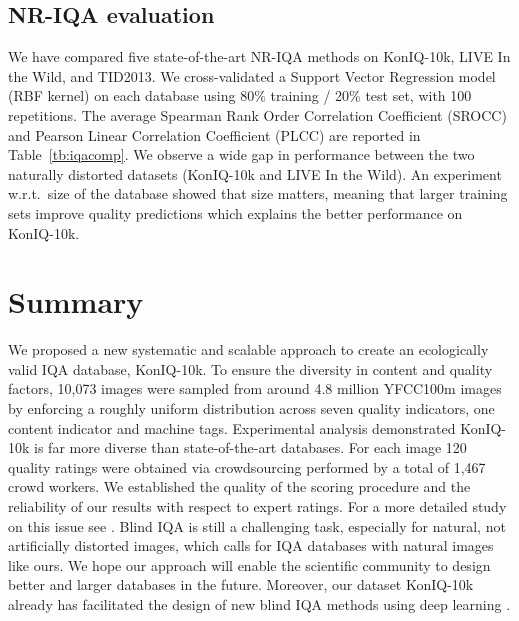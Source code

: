 \documentclass{article}
\begin{document}
\vspace{-5pt}
\subsection{NR-IQA evaluation}














We have compared five state-of-the-art NR-IQA  \cite{Moorthy:2010, Saad:2012, Mittal:2012, Moorthy:2011, Liu:2014b} methods on KonIQ-10k, LIVE In the Wild, and TID2013.
We cross-validated a Support Vector Regression model (RBF kernel) on each database using 80\% training / 20\% test set, with 100 repetitions. The average Spearman Rank Order Correlation Coefficient (SROCC) and Pearson Linear Correlation Coefficient (PLCC) are reported in Table~\ref{tb:iqacomp}. 
We observe a wide gap in performance between the two naturally distorted datasets (KonIQ-10k and LIVE In the Wild). An experiment w.r.t.\ size of the database showed that size matters, meaning that larger training sets improve quality predictions which explains the better performance on KonIQ-10k.
\vspace{-3pt}
\section{Summary}

We proposed a new systematic and scalable approach to create an ecologically valid IQA database, KonIQ-10k. To ensure the diversity in content and quality factors, 10,073 images were sampled from around 4.8 million YFCC100m images by enforcing a roughly uniform distribution across seven quality indicators, one content indicator and machine tags. Experimental analysis demonstrated KonIQ-10k is far more diverse than state-of-the-art databases. For each image 120 quality ratings were obtained via crowdsourcing performed by a total of 1,467 crowd workers. We established the quality of the scoring procedure and the reliability of our results with respect to expert ratings. For a more detailed study on this issue see \cite{QoMEXReliability}. Blind IQA is still a challenging task, especially for natural, not artificially distorted images, which calls for IQA databases with natural images like ours. We hope our approach will enable the scientific community to design better and larger databases in the future. Moreover, our dataset KonIQ-10k already has facilitated the design of new blind IQA methods using deep learning \cite{DeepRN,PatchNet}.
\end{document}
